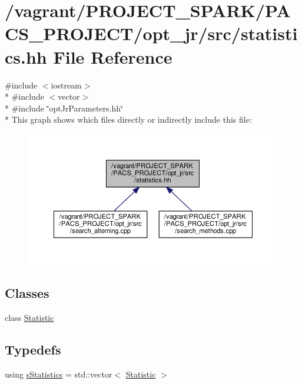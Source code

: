 \hypertarget{statistics_8hh}{\section{/vagrant/\-P\-R\-O\-J\-E\-C\-T\-\_\-\-S\-P\-A\-R\-K/\-P\-A\-C\-S\-\_\-\-P\-R\-O\-J\-E\-C\-T/opt\-\_\-jr/src/statistics.hh File Reference}
\label{statistics_8hh}
}
{\ttfamily \#include $<$iostream$>$}\\*
{\ttfamily \#include $<$vector$>$}\\*
{\ttfamily \#include \char`\"{}opt\-Jr\-Parameters.\-hh\char`\"{}}\\*
This graph shows which files directly or indirectly include this file\-:\nopagebreak
\begin{figure}[H]
\begin{center}
\leavevmode
\includegraphics[width=350pt]{statistics_8hh__dep__incl}
\end{center}
\end{figure}
\subsection*{Classes}
\begin{DoxyCompactItemize}
\item 
class \hyperlink{classStatistic}{Statistic}
\end{DoxyCompactItemize}
\subsection*{Typedefs}
\begin{DoxyCompactItemize}
\item 
using \hyperlink{statistics_8hh_abd0800e960b601bba1c0734f6f8e4949}{s\-Statistics} = std\-::vector$<$ \hyperlink{classStatistic}{Statistic} $>$
\end{DoxyCompactItemize}
